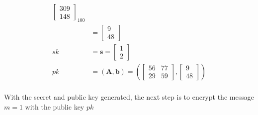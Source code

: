 \begin{align*}
\begin{bmatrix}
                   309 \\
                   148\end{bmatrix}_{100}                            \\
             & = \begin{bmatrix}
                   9 \\ 
                   48 
                 \end{bmatrix}                                   \\
  sk         & = \textbf{s} =  \begin{bmatrix}1 \\ 2 \end{bmatrix} \\
  pk         & = (\textbf{A}, \textbf{b}) = \left (
  \begin{bmatrix}
      56 & 77   \\
      29 & 59 
    \end{bmatrix},
  \begin{bmatrix}
      9 \\
      48 
    \end{bmatrix} \right )                                           \\
\end{align*}

With the secret and public key generated, the next step is to encrypt the message $m=1$ with the public key $pk$

